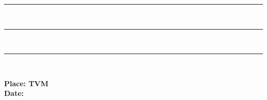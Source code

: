 	\centering
	\begin{minipage}[t]{.3\textwidth}
		\centering

\hrule 
\vspace{0.28\baselineskip}
{\bf \Supervisor \\ \SupervisorPosition} \par
{} 
	\end{minipage}%
	\begin{minipage}[t]{0.3\textwidth}
	
\centering
\hrule 
\vspace{0.28\baselineskip}
{\bf \Supervisora\\ \SupervisorPositiona} \par
{}
	\end{minipage}%
	\begin{minipage}[t]{0.3\textwidth}
		\centering
		\hrule 
	\vspace{0.28\baselineskip}
	{\bf \Supervisorb\\ \SupervisorPositionb} \par
		
	\end{minipage}
\vspace{3\baselineskip}
\begin{flushleft}
	\begin{minipage}[t]{0.33\textwidth}
		{\bf Place: TVM \\}
		{\bf Date: \reportSubmissionDate}
	\end{minipage}
\end{flushleft}
\thispagestyle{empty}